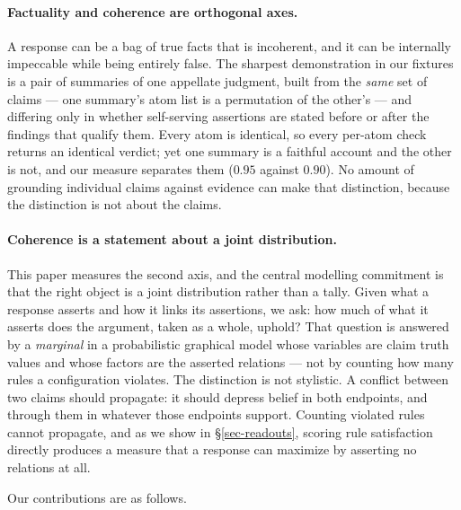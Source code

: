 \paragraph{Factuality and coherence are orthogonal axes.} A response can be a bag of true facts
that is incoherent, and it can be internally impeccable while being entirely false. The sharpest
demonstration in our fixtures is a pair of summaries of one appellate judgment, built from the
\emph{same} set of claims --- one summary's atom list is a permutation of the other's --- and
differing only in whether self-serving assertions are stated before or after the findings that
qualify them. Every atom is identical, so every per-atom check returns an identical verdict; yet one summary is a faithful account and the other is not, and our measure
separates them ($0.95$ against $0.90$). No amount of grounding individual claims against evidence
can make that distinction, because the distinction is not about the claims.

\paragraph{Coherence is a statement about a joint distribution.} This paper measures the second
axis, and the central modelling commitment is that the right object is a joint distribution rather
than a tally. Given what a response asserts and how it links its assertions, we ask: how much of
what it asserts does the argument, taken as a whole, uphold? That question is answered by a
\emph{marginal} in a probabilistic graphical model whose variables are claim truth values and
whose factors are the asserted relations --- not by counting how many rules a configuration
violates. The distinction is not stylistic. A conflict between two claims should propagate: it
should depress belief in both endpoints, and through them in whatever those endpoints support.
Counting violated rules cannot propagate, and as we show in \S\ref{sec-readouts}, scoring rule
satisfaction directly produces a measure that a response can maximize by asserting no relations
at all.

Our contributions are as follows.

